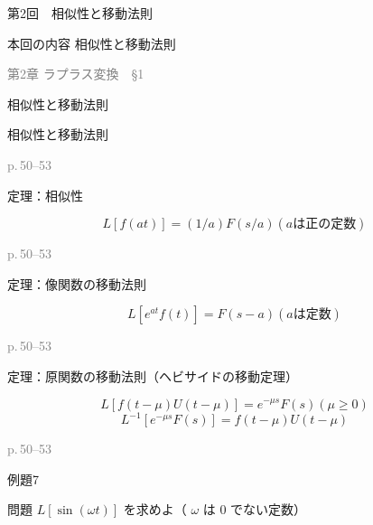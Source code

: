 \documentclass[aspectratio=43,professionalfonts,handout]{beamer}
\begin{document}
\begin{frame}{第2回　相似性と移動法則}
  \begin{block}{本回の内容}
  相似性と移動法則
  \end{block}
  \vfill\hfill{\scriptsize \textcolor{gray}{第2章 ラプラス変換　§1}}
\end{frame}

\begin{frame}{相似性と移動法則}
  \begin{block}{}
  {\large 相似性と移動法則}
  \end{block}
  \vfill\hfill{\scriptsize \textcolor{gray}{p.\,50--53}}
\end{frame}

\begin{frame}{定理：相似性}
  \begin{block}{}
  \[
    L[f(at)] = (1/a) F(s/a)  (a は正の定数)
  \]
  \end{block}
  \vfill\hfill{\scriptsize \textcolor{gray}{p.\,50--53}}
\end{frame}

\begin{frame}{定理：像関数の移動法則}
  \begin{block}{}
  \[
    L[e^{at}f(t)] = F(s-a)  (a は定数)
  \]
  \end{block}
  \vfill\hfill{\scriptsize \textcolor{gray}{p.\,50--53}}
\end{frame}

\begin{frame}{定理：原関数の移動法則（ヘビサイドの移動定理）}
  \begin{block}{}
  \[
    L[f(t-\mu)U(t-\mu)] = e^{-\mu s}F(s)  (\mu \geq 0)
  \]
  \[
    L^{-1}[e^{-\mu s}F(s)] = f(t-\mu)U(t-\mu)
  \]
  \end{block}
  \vfill\hfill{\scriptsize \textcolor{gray}{p.\,50--53}}
\end{frame}

\begin{frame}{例題7}
  \begin{exampleblock}{問題}
    $L[\sin(\omega t)]$ を求めよ（ $\omega$ は 0 でない定数）\\[2pt]
  \end{exampleblock}
\end{frame}
\end{document}
